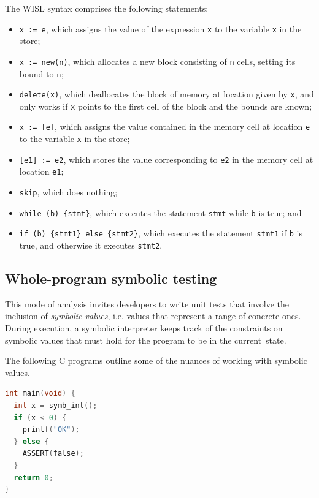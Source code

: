 The WISL syntax comprises the following statements:
\begin{itemize}
  \item \texttt{x := e}, which assigns the value of the expression \texttt{x} to the variable \texttt{x} in the store;
  \item \texttt{x := new(n)}, which allocates a new block consisting of \texttt{n} cells, setting its bound to n;
  \item \texttt{delete(x)}, which deallocates the block of memory at location given by \texttt{x}, and only works if \texttt{x} points to the first cell of the block and the bounds are known;
  \item \texttt{x := [e]}, which assigns the value contained in the memory cell at location \texttt{e} to the variable \texttt{x} in the store;
  \item \texttt{[e1] := e2}, which stores the value corresponding to \texttt{e2} in the memory cell at location \texttt{e1};
  \item \texttt{skip}, which does nothing;
  \item \texttt{while (b) \{stmt\}}, which executes the statement \texttt{stmt} while \texttt{b} is true; and
  \item \texttt{if (b) \{stmt1\} else \{stmt2\}}, which executes the statement \texttt{stmt1} if \texttt{b} is true, and otherwise it executes \texttt{stmt2}.
\end{itemize}

\subsection{Whole-program symbolic testing}

This mode of analysis invites developers to write unit tests that involve the
inclusion of \textit{symbolic values}, i.e. values that represent a range of
concrete ones. During execution, a symbolic interpreter keeps track of the
constraints on symbolic values that must hold for the program to be in the
current~state.

The following C programs outline some of the nuances of working with symbolic
values.

\begin{lstlisting}[caption={Symbolic execution - basic example}, style=code, language=C]
int main(void) {
  int x = symb_int();
  if (x < 0) {
    printf("OK");
  } else {
    ASSERT(false);
  }
  return 0;
}
\end{lstlisting}

